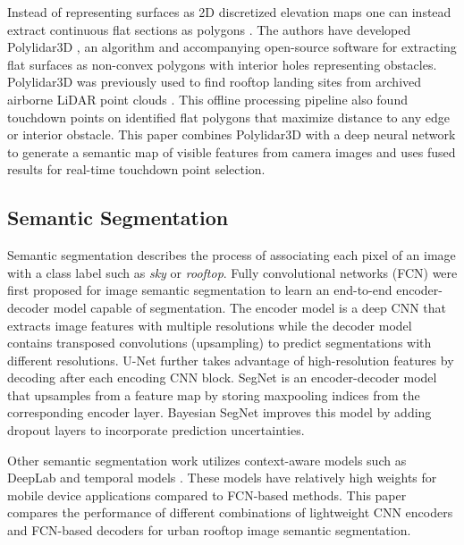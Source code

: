 Instead of representing surfaces as 2D discretized elevation maps one can instead extract continuous flat sections as polygons \cite{lee_indoor_2012-1}. The authors have developed Polylidar3D \cite{castagno_polylidar3d_2020}, an algorithm and accompanying open-source software for extracting flat surfaces as non-convex polygons with interior holes representing obstacles.  Polylidar3D was previously used to find rooftop landing sites from archived airborne LiDAR point clouds  \cite{castagno_map-based_2021}. This offline processing pipeline also found touchdown points on identified flat polygons that maximize distance to any edge or interior obstacle. This paper combines Polylidar3D with a deep neural network to generate a semantic map of visible features from camera images and uses fused results for real-time touchdown point selection.

\subsection{Semantic Segmentation}\label{sec:ch6_related_pixel}
Semantic segmentation describes the process of associating each pixel of an image with a class label such as \emph{sky} or \emph{rooftop}.  Fully convolutional networks (FCN) were first proposed for image semantic segmentation \cite{shelhamer_fully_2017} to learn an end-to-end encoder-decoder model capable of segmentation. The encoder model is a deep CNN that extracts image features with multiple resolutions while the decoder model contains transposed convolutions (upsampling) to predict segmentations with different resolutions. U-Net \cite{ronneberger_u-net_2015} further takes advantage of high-resolution features by decoding after each encoding CNN block. SegNet \cite{badrinarayanan_segnet_2017} is an encoder-decoder model that upsamples from a feature map by storing maxpooling indices from the corresponding encoder layer. Bayesian SegNet \cite{kendall_bayesian_2017} improves this model by adding dropout layers to incorporate prediction uncertainties.

Other semantic segmentation work utilizes context-aware models such as DeepLab \cite{chen_rethinking_2017, chen_deeplab_2018} and temporal models \cite{siam_comparative_2018}. These models have relatively high weights for mobile device applications compared to FCN-based methods. This paper compares the performance of different combinations of lightweight CNN encoders and FCN-based decoders for urban rooftop image semantic segmentation. 


